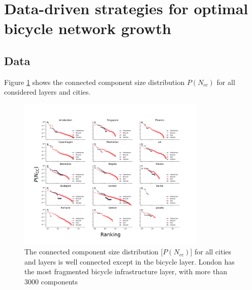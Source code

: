 

\section{Data-driven strategies for optimal bicycle network growth}
\subsection{Data}

Figure \ref{fig:Nodes} shows the connected component size distribution $P(N_{cc})$ for all considered layers and cities.

\begin{figure}[h!]
  \centering
  \includegraphics[width=0.8\textwidth]{images/datadriven/Nodes_cc.png}
  \caption[Connected component size distribution for analyzed cities]{The connected component size distribution [$P(N_{cc})$] for all cities and layers is well connected except in the bicycle layer. London has the most fragmented bicycle infrastructure layer, with more than 3000 components}
  \label{fig:Nodes}
\end{figure}


